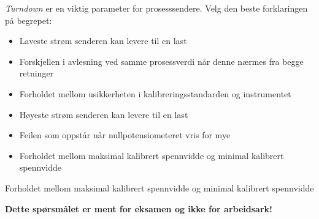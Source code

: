 
{\it Turndown} er en viktig parameter for prosesssendere. Velg den beste forklaringen på begrepet:

\vskip 10pt

\begin{itemize}
\item{} Laveste strøm senderen kan levere til en last
\vskip 10pt
\item{} Forskjellen i avlesning ved samme prosessverdi når denne nærmes fra begge retninger
\vskip 10pt
\item{} Forholdet mellom usikkerheten i kalibreringsstandarden og instrumentet
\vskip 10pt
\item{} Høyeste strøm senderen kan levere til en last
\vskip 10pt
\item{} Feilen som oppstår når nullpotensiometeret vris for mye
\vskip 10pt
\item{} Forholdet mellom maksimal kalibrert spennvidde og minimal kalibrert spennvidde
\end{itemize}







Forholdet mellom maksimal kalibrert spennvidde og minimal kalibrert spennvidde







{\bf Dette spørsmålet er ment for eksamen og ikke for arbeidsark!}

